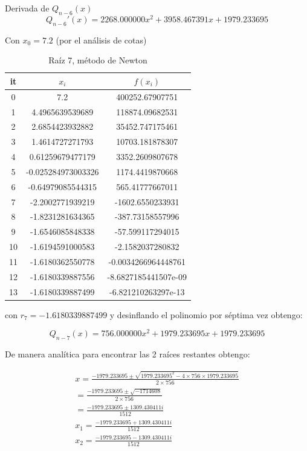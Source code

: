 \documentclass{article} %
\begin{document}
Derivada de $Q_{n-6}(x)$
\begin{equation*}
    Q_{n-6}'(x) = 2268.000000x^2 + 3958.467391x + 1979.233695
\end{equation*}

Con $x_0 = 7.2$ (por el análisis de cotas)

\begin{table}[H]
\centering
\begin{tabular}{|c|c|c|}
\hline
it & $x_i$ & $f(x_i)$\\
\hline
0 & 7.2 & 400252.67907751\\
1 & 4.4965639539689 & 118874.09682531\\
2 & 2.6854423932882 & 35452.747175461\\
3 & 1.4614727271793 & 10703.181878307\\
4 & 0.61259679477179 & 3352.2609807678\\
5 & -0.025284973003326 & 1174.4419870668\\
6 & -0.64979085544315 & 565.41777667011\\
7 & -2.2002771939219 & -1602.6550233931\\
8 & -1.8231281634365 & -387.73158557996\\
9 & -1.6546085848338 & -57.599117294015\\
10 & -1.6194591000583 & -2.1582037280832\\
11 & -1.6180362550778 & -0.0034266964448761\\
12 & -1.6180339887556 & -8.6827185441507e-09\\
13 & -1.6180339887499 & -6.821210263297e-13\\
\hline
\end{tabular}
\caption{Raíz 7, método de Newton}
\end{table}

con $r_7 = -1.6180339887499$ y desinflando el polinomio por séptima vez obtengo:

\begin{equation*}
    Q_{n-7}(x) = 756.000000x^2 + 1979.233695x + 1979.233695
\end{equation*}

De manera analítica para encontrar las 2 raíces restantes obtengo:

\begin{gather*}
    x = \frac{-1979.233695 \pm \sqrt{1979.233695^2 -4\times756\times1979.233695}}{2\times 756}\\
    = \frac{-1979.233695 \pm \sqrt{-1714608}}{2\times 756}\\
    = \frac{-1979.233695 \pm 1309.430411i}{1512}\\
    x_1 = \frac{-1979.233695 + 1309.430411i}{1512}\\
    x_2 = \frac{-1979.233695 - 1309.430411i}{1512}\\
\end{gather*}
\end{document}
